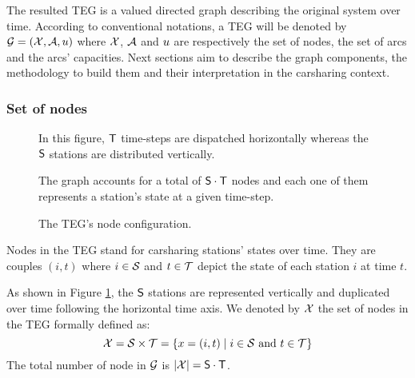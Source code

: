 \medskip
The resulted TEG is a valued directed graph describing the original system over time.
According to conventional notations, a TEG will be denoted by $\mathcal{G} = (\mathcal{X}, \mathcal{A}, u)$ where $\mathcal{X}$, $\mathcal{A}$ and $u$ are respectively the set of nodes, the set of arcs and the arcs' capacities.
Next sections aim to describe the graph components, the methodology to build them and their interpretation in the carsharing context.


\subsubsection{Set of nodes}

\begin{figure}[t]
\begin{minipage}{.65\textwidth}
\begin{center}

\end{center}
\end{minipage}
\begin{minipage}{.3\textwidth}
In this figure, $\mathsf{T}$ time-steps are dispatched horizontally whereas the $\mathsf{S}$ stations are distributed vertically.

\bigskip
The graph accounts for a total of $\mathsf{S} \cdot \mathsf{T}$ nodes and each one of them represents a station's state at a given time-step.
\end{minipage}
\caption{The TEG's node configuration.}
\label{fig:tegNodes}
\end{figure}

Nodes in the TEG stand for carsharing stations' states over time.
They are couples $(i,t)$ where $i \in \mathcal{S}$ and $t \in \mathcal{T}$ depict the state of each station $i$ at time $t$.
\medskip

As shown in Figure \ref{fig:tegNodes}, the $\mathsf{S}$ stations are represented vertically and duplicated over time following the horizontal time axis.
We denoted by $\mathcal{X}$ the set of nodes in the TEG formally defined as:
\begin{equation}
\mathcal{X} = \mathcal{S} \times \mathcal{T} = \{x=(i,t) \mid i \in \mathcal{S} \text{ and } t \in \mathcal{T}\}
\end{equation}
The total number of node in $\mathcal{G}$ is $|\mathcal{X}| = \mathsf{S} \cdot \mathsf{T}$.
\medskip

